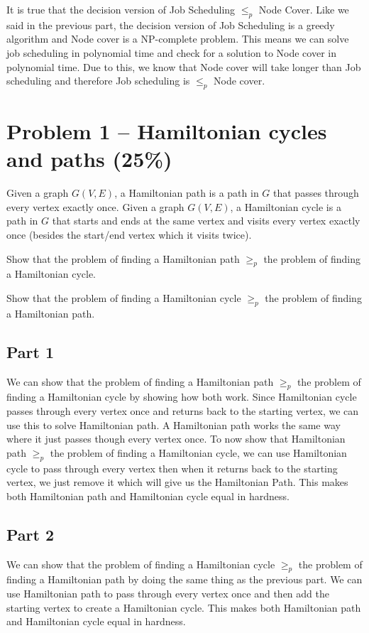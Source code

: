 \documentclass[12pt,letterpaper]{article}
\begin{document}
It is true that the decision version of Job Scheduling $\leq_p$ Node Cover. Like we said in the previous part, the decision version of Job Scheduling is a greedy algorithm and Node cover is a NP-complete problem. This means we can solve job scheduling in polynomial time and check for a solution to Node cover in polynomial time. Due to this, we know that Node cover will take longer than Job scheduling and therefore Job scheduling is $\leq_p$ Node cover.

\section*{Problem 1 -- Hamiltonian cycles and paths (25\%)}
Given a graph $G(V,E)$, a Hamiltonian path is a path in $G$ that passes through every vertex exactly once.
Given a graph $G(V,E)$, a Hamiltonian cycle is a path in $G$ that starts and ends at the same vertex and visits every vertex exactly once (besides the start/end vertex which it visits twice).

Show that the problem of finding a Hamiltonian path $\geq_p$ the problem of finding a Hamiltonian cycle.

Show that the problem of finding a Hamiltonian cycle $\geq_p$ the problem of finding a Hamiltonian path.

\subsection{Part 1}

We can show that the problem of finding a Hamiltonian path $\geq_p$ the problem of finding a Hamiltonian cycle by showing how both work. Since Hamiltonian cycle passes through every vertex once and returns back to the starting vertex, we can use this to solve Hamiltonian path. A Hamiltonian path works the same way where it just passes though every vertex once. To now show that Hamiltonian path $\geq_p$ the problem of finding a Hamiltonian cycle, we can use Hamiltonian cycle to pass through every vertex then when it returns back to the starting vertex, we just remove it which will give us the Hamiltonian Path.
This makes both Hamiltonian path and Hamiltonian cycle equal in hardness.

\subsection{Part 2}

We can show that the problem of finding a Hamiltonian cycle $\geq_p$ the problem of finding a Hamiltonian path by doing the same thing as the previous part. We can use Hamiltonian path to pass through every vertex once and then add the starting vertex to create a Hamiltonian cycle. This makes both Hamiltonian path and Hamiltonian cycle equal in hardness.
\end{document}

